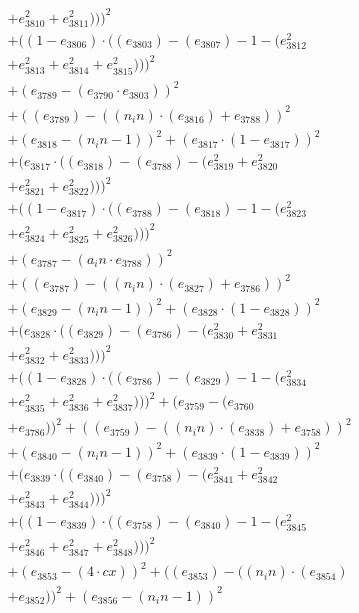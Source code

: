 \documentclass[10pt, a4paper]{article}
\begin{document}
\begin{small}
\begin{align*}
& + e_{3810}^{2} + e_{3811}^{2})))^{2} \\
& + ((1 - e_{3806})  \cdot  ((e_{3803}) - (e_{3807}) - 1 - (e_{3812}^{2} \\
& + e_{3813}^{2} + e_{3814}^{2} + e_{3815}^{2})))^{2} \\
& + (e_{3789} - (e_{3790}  \cdot  e_{3803}))^{2} \\
& + ((e_{3789}) - ((n_in)  \cdot  (e_{3816}) + e_{3788}))^{2} \\
& + (e_{3818} - (n_in - 1))^{2} + (e_{3817}  \cdot  (1 - e_{3817}))^{2} \\
& + (e_{3817}  \cdot  ((e_{3818}) - (e_{3788}) - (e_{3819}^{2} + e_{3820}^{2} \\
& + e_{3821}^{2} + e_{3822}^{2})))^{2} \\
& + ((1 - e_{3817})  \cdot  ((e_{3788}) - (e_{3818}) - 1 - (e_{3823}^{2} \\
& + e_{3824}^{2} + e_{3825}^{2} + e_{3826}^{2})))^{2} \\
& + (e_{3787} - (a_in  \cdot  e_{3788}))^{2} \\
& + ((e_{3787}) - ((n_in)  \cdot  (e_{3827}) + e_{3786}))^{2} \\
& + (e_{3829} - (n_in - 1))^{2} + (e_{3828}  \cdot  (1 - e_{3828}))^{2} \\
& + (e_{3828}  \cdot  ((e_{3829}) - (e_{3786}) - (e_{3830}^{2} + e_{3831}^{2} \\
& + e_{3832}^{2} + e_{3833}^{2})))^{2} \\
& + ((1 - e_{3828})  \cdot  ((e_{3786}) - (e_{3829}) - 1 - (e_{3834}^{2} \\
& + e_{3835}^{2} + e_{3836}^{2} + e_{3837}^{2})))^{2} + (e_{3759} - (e_{3760} \\
& + e_{3786}))^{2} + ((e_{3759}) - ((n_in)  \cdot  (e_{3838}) + e_{3758}))^{2} \\
& + (e_{3840} - (n_in - 1))^{2} + (e_{3839}  \cdot  (1 - e_{3839}))^{2} \\
& + (e_{3839}  \cdot  ((e_{3840}) - (e_{3758}) - (e_{3841}^{2} + e_{3842}^{2} \\
& + e_{3843}^{2} + e_{3844}^{2})))^{2} \\
& + ((1 - e_{3839})  \cdot  ((e_{3758}) - (e_{3840}) - 1 - (e_{3845}^{2} \\
& + e_{3846}^{2} + e_{3847}^{2} + e_{3848}^{2})))^{2} \\
& + (e_{3853} - (4  \cdot  cx))^{2} + ((e_{3853}) - ((n_in)  \cdot  (e_{3854}) \\
& + e_{3852}))^{2} + (e_{3856} - (n_in - 1))^{2} \\

\end{align*}
\end{small}
\end{document}
